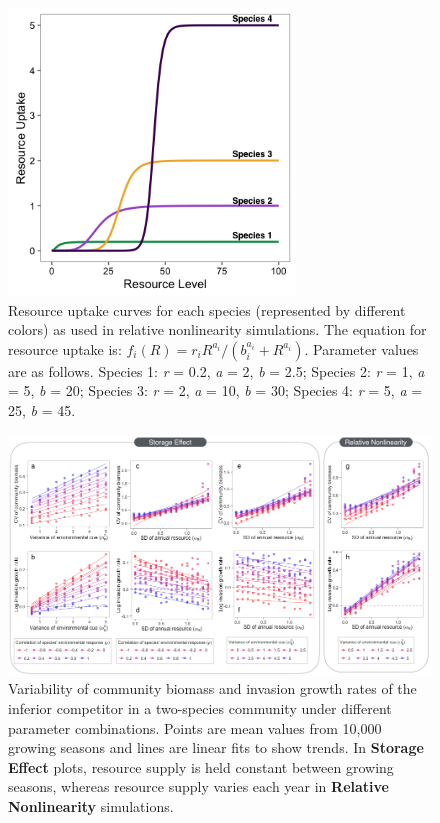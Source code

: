 \documentclass[11pt,]{article}
\begin{document}
\begin{figure}[!ht]
  \centering
      \includegraphics[width=3in]{./components/fourspp_Ruptake_relnonlin.png}
  \caption{Resource uptake curves for each species (represented by different colors) as used in relative nonlinearity simulations. The equation for resource uptake is: $f_{i}(R) = r_{i}R^{a_{i}} / (b_{i}^{a_{i}}+R^{a_{i}})$. Parameter values are as follows. Species 1: \emph{r} = 0.2, \emph{a} = 2, \emph{b} = 2.5; Species 2: \emph{r} = 1, \emph{a} = 5, \emph{b} = 20; Species 3: \emph{r} = 2, \emph{a} = 10, \emph{b} = 30; Species 4: \emph{r} = 5, \emph{a} = 25, \emph{b} = 45.}
\end{figure}

\newpage{}

\begin{figure}[!ht]
  \centering
      \includegraphics[width=6.5in]{./components/SI_invasion_factorials.png}
  \caption{Variability of community biomass and invasion growth rates of the inferior competitor in a two-species community under different parameter combinations. Points are mean values from 10,000 growing seasons and lines are linear fits to show trends. In \textbf{Storage Effect} plots, resource supply is held constant between growing seasons, whereas resource supply varies each year in \textbf{Relative Nonlinearity} simulations.}
\end{figure}
\end{document}
